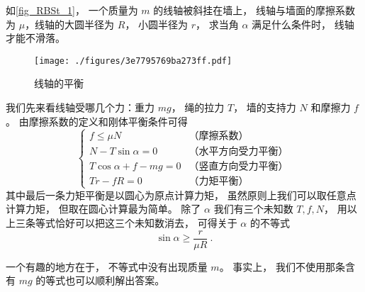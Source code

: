 \begin{example}{}\label{ex_RBSt_1}
如\autoref{fig_RBSt_1}， 一个质量为 $m$ 的线轴被斜挂在墙上， 线轴与墙面的摩擦系数为 $\mu$，线轴的大圆半径为 $R$， 小圆半径为 $r$， 求当角 $\alpha$ 满足什么条件时， 线轴才能不滑落。
\begin{figure}[ht]
\centering
\texttt{[image: ./figures/3e7795769ba273ff.pdf]}
\caption{线轴的平衡} \label{fig_RBSt_1}
\end{figure}

我们先来看线轴受哪几个力：重力 $mg$， 绳的拉力 $T$， 墙的支持力 $N$ 和摩擦力 $f$。 由摩擦系数的定义和刚体平衡条件可得
\begin{equation}
\begin{cases}
f \leqslant \mu N & \text{（摩擦系数）}\\
N - T\sin\alpha = 0 & \text{（水平方向受力平衡）}\\
T\cos\alpha + f - mg = 0 & \text{（竖直方向受力平衡）}\\
Tr - fR = 0 & \text{（力矩平衡）}
\end{cases}
\end{equation}
其中最后一条力矩平衡是以圆心为原点计算力矩， 虽然原则上我们可以取任意点计算力矩， 但取在圆心计算最为简单。 除了 $\alpha$ 我们有三个未知数 $T, f, N$， 用以上三条等式恰好可以把这三个未知数消去， 可得关于 $\alpha$ 的不等式
\begin{equation}
\sin\alpha \geqslant \frac{r}{\mu R}~.
\end{equation}

一个有趣的地方在于， 不等式中没有出现质量 $m$。 事实上， 我们不使用那条含有 $mg$ 的等式也可以顺利解出答案。
\end{example}

